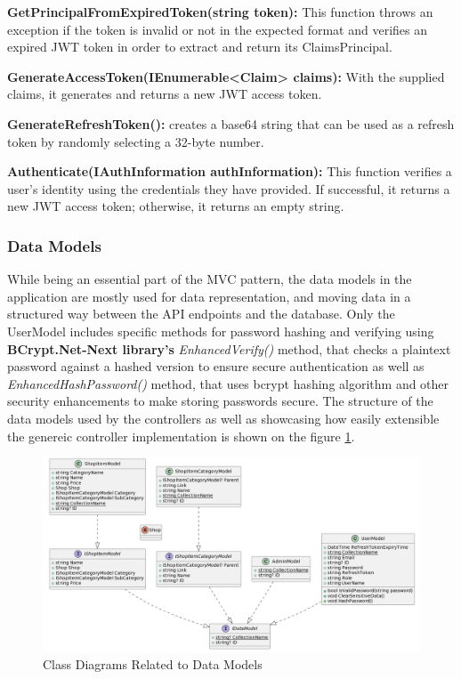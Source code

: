 \textbf{ GetPrincipalFromExpiredToken(string token):} This function throws an exception if the token is invalid or not in the expected format and verifies an expired JWT token in order to extract and return its ClaimsPrincipal.
 
\textbf{ GenerateAccessToken(IEnumerable<Claim> claims):} With the supplied claims, it generates and returns a new JWT access token.
 
\textbf{ GenerateRefreshToken():} creates a base64 string that can be used as a refresh token by randomly selecting a 32-byte number.
 
\textbf{ Authenticate(IAuthInformation authInformation):} This function verifies a user's identity using the credentials they have provided. If successful, it returns a new JWT access token; otherwise, it returns an empty string.
 
\subsubsection{Data Models}

While being an essential part of the MVC pattern, the  data models in the application are mostly used for data representation, and moving data in a structured way between the API endpoints and the database. Only the UserModel includes specific methods for password hashing and verifying using \textbf{BCrypt.Net-Next library's} \textit{EnhancedVerify()} method, that checks a plaintext password against a hashed version to ensure secure authentication as well as \textit{EnhancedHashPassword()} method, that uses bcrypt hashing algorithm and other security enhancements to make storing passwords secure. The structure of the data models used by the controllers as well as showcasing how easily extensible the genereic controller implementation is shown on the figure \ref{fig:dcd}.

\begin{figure}[H]
	\centering
	\includegraphics[width=1\linewidth]{img/datamodel_classdiagram.png}
	\caption{Class Diagrams Related to Data Models}
	\label{fig:dcd}
\end{figure}

